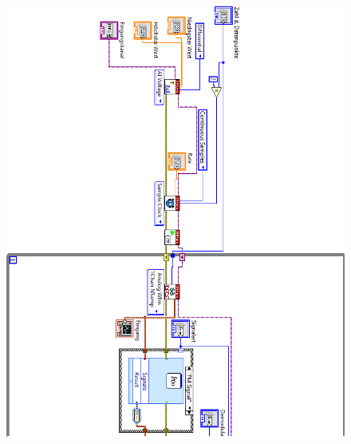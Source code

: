 \newpage
\pagestyle{empty}
\begin{figure}[H]
	\centering
	\includegraphics[width=\textwidth]{pic/messstruktur_dafpm1.png}
\end{figure} 
